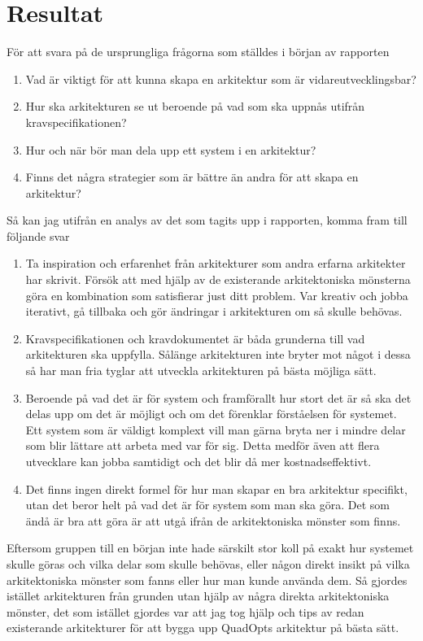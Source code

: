 \section{Resultat}
För att svara på de ursprungliga frågorna som ställdes i början av rapporten

\begin{enumerate}
	\item Vad är viktigt för att kunna skapa en arkitektur som är vidareutvecklingsbar?
	\item Hur ska arkitekturen se ut beroende på vad som ska uppnås utifrån kravspecifikationen?
	\item Hur och när bör man dela upp ett system i en arkitektur?
	\item Finns det några strategier som är bättre än andra för att skapa en arkitektur?
\end{enumerate}Så kan jag utifrån en analys av det som tagits upp i rapporten, komma fram till följande svar

\begin{enumerate}
	\item Ta inspiration och erfarenhet från arkitekturer som andra erfarna arkitekter har skrivit. Försök att med hjälp av de existerande arkitektoniska mönsterna göra en kombination som satisfierar just ditt problem. Var kreativ och jobba iterativt, gå tillbaka och gör ändringar i arkitekturen om så skulle behövas.
	\item Kravspecifikationen och kravdokumentet är båda grunderna till vad arkitekturen ska uppfylla. Sålänge arkitekturen inte bryter mot något i dessa så har man fria tyglar att utveckla arkitekturen på bästa möjliga sätt.
	\item Beroende på vad det är för system och framförallt hur stort det är så ska det delas upp om det är möjligt och om det förenklar förståelsen för systemet. Ett system som är väldigt komplext vill man gärna bryta ner i mindre delar som blir lättare att arbeta med var för sig. Detta medför även att flera utvecklare kan jobba samtidigt och det blir då mer kostnadseffektivt.
	\item Det finns ingen direkt formel för hur man skapar en bra arkitektur specifikt, utan det beror helt på vad det är för system som man ska göra. Det som ändå är bra att göra är att utgå ifrån de arkitektoniska mönster som finns.
\end{enumerate}Eftersom gruppen till en början inte hade särskilt stor koll på exakt hur systemet skulle göras och vilka delar som skulle behövas, eller någon direkt insikt på vilka arkitektoniska mönster som fanns eller hur man kunde använda dem. Så gjordes istället arkitekturen från grunden utan hjälp av några direkta arkitektoniska mönster, det som istället gjordes var att jag tog hjälp och tips av redan existerande arkitekturer för att bygga upp QuadOpts arkitektur på bästa sätt.
